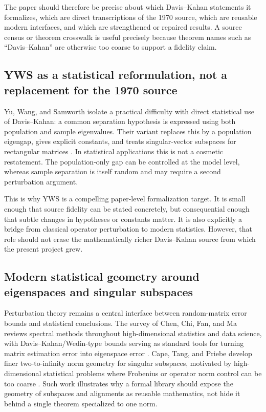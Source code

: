 \documentclass[11pt]{article}
\begin{document}
The paper should therefore be precise about which Davis--Kahan statements it
formalizes, which are direct transcriptions of the 1970 source, which are
reusable modern interfaces, and which are strengthened or repaired results.  A
source census or theorem crosswalk is useful precisely because theorem names
such as ``Davis--Kahan'' are otherwise too coarse to support a fidelity claim.

\subsection{YWS as a statistical reformulation, not a replacement for the 1970 source}

Yu, Wang, and Samworth isolate a practical difficulty with direct statistical
use of Davis--Kahan: a common separation hypothesis is expressed using both
population and sample eigenvalues.  Their variant replaces this by a population
eigengap, gives explicit constants, and treats singular-vector subspaces for
rectangular matrices \citep{yu2015davis}.  In statistical applications this is
not a cosmetic restatement.  The population-only gap can be controlled at the
model level, whereas sample separation is itself random and may require a
second perturbation argument.

This is why YWS is a compelling paper-level formalization target.  It is small
enough that source fidelity can be stated concretely, but consequential enough
that subtle changes in hypotheses or constants matter.  It is also explicitly a
bridge from classical operator perturbation to modern statistics.  However,
that role should not erase the mathematically richer Davis--Kahan source from
which the present project grew.

\subsection{Modern statistical geometry around eigenspaces and singular subspaces}

Perturbation theory remains a central interface between random-matrix error
bounds and statistical conclusions.  The survey of Chen, Chi, Fan, and Ma
reviews spectral methods throughout high-dimensional statistics and data
science, with Davis--Kahan/Wedin-type bounds serving as standard tools for
turning matrix estimation error into eigenspace error \citep{chen2021spectral}.
Cape, Tang, and Priebe develop finer two-to-infinity norm geometry for singular
subspaces, motivated by high-dimensional statistical problems where Frobenius
or operator norm control can be too coarse \citep{cape2019two}.  Such work
illustrates why a formal library should expose the geometry of subspaces and
alignments as reusable mathematics, not hide it behind a single theorem
specialized to one norm.
\end{document}
